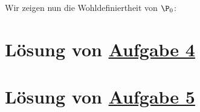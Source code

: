 Wir zeigen nun die Wohldefiniertheit von $\P_0$:

\section{Lösung von 
	\texorpdfstring{\hyperref[aufg:4]{Aufgabe 4}}{}
}\label{loes:4}

\section{Lösung von 
	\texorpdfstring{\hyperref[aufg:5]{Aufgabe 5}}{}
}\label{loes:5}






